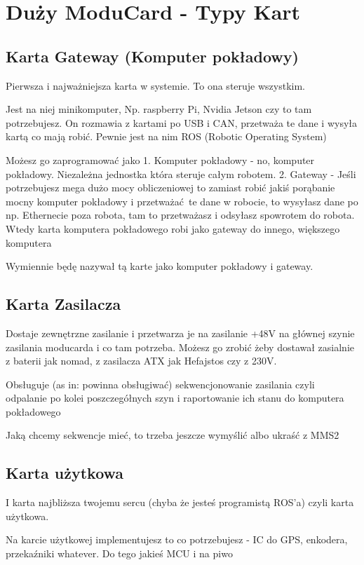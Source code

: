 \documentclass[b5paper, 10pt, twoside]{book}
\begin{document}

\section{Duży ModuCard - Typy Kart}
\subsection{Karta Gateway (Komputer pokładowy)}
Pierwsza i najważniejsza karta w systemie. To ona steruje wszystkim.

Jest na niej minikomputer, Np. raspberry Pi, Nvidia Jetson czy to tam potrzebujesz. On rozmawia z kartami po USB i CAN, przetważa te dane i wysyła kartą co mają robić. Pewnie jest na nim ROS (Robotic Operating System)

Możesz go zaprogramować jako
1. Komputer pokładowy - no, komputer pokładowy. Niezależna jednostka która steruje całym robotem.
2. Gateway - Jeśli potrzebujesz mega dużo mocy obliczeniowej to zamiast robić jakiś porąbanie mocny komputer pokładowy i przetważać te dane w robocie, to wysyłasz dane po np. Ethernecie poza robota, tam to przetważasz i odsyłasz spowrotem do robota. Wtedy karta komputera pokładowego robi jako gateway do innego, większego komputera

Wymiennie będę nazywał tą karte jako komputer pokładowy i gateway.

\subsection{Karta Zasilacza}
Dostaje zewnętrzne zasilanie i przetwarza je na zasilanie +48V na głównej szynie zasilania moducarda i co tam potrzeba. Możesz go zrobić żeby dostawał zasialnie z baterii jak nomad, z zasilacza ATX jak Hefajstos czy z 230V.

Obsługuje (as in: powinna obsługiwać) sekwencjonowanie zasilania czyli odpalanie po kolei poszczegółnych szyn i raportowanie ich stanu do komputera pokładowego

Jaką chcemy sekwencje mieć, to trzeba jeszcze wymyślić albo ukraść z MMS2

\subsection{Karta użytkowa}
I karta najbliższa twojemu sercu (chyba że jesteś programistą ROS'a) czyli karta użytkowa.

Na karcie użytkowej implementujesz to co potrzebujesz - IC do GPS, enkodera, przekaźniki whatever. Do tego jakieś MCU i na piwo
\end{document}
